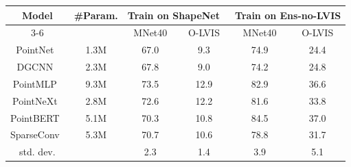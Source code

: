   \scriptsize
  \setlength{\tabcolsep}{1.7pt}
  \centering
  \vspace{-1em}
    \begin{tabular}{c|c|cc|cc}
    \toprule
    \multirow{2}[2]{*}{Model} & \multirow{2}[2]{*}{\#Param.} & \multicolumn{2}{c|}{Train on ShapeNet~\cite{chang2015shapenet}} & \multicolumn{2}{c}{Train on Ens-no-LVIS} \\
    \cmidrule{3-6}
          &       & MNet40  & O-LVIS & MNet40 & O-LVIS \\
    \midrule
    PointNet~\cite{qi2017pointnet}   & 1.3M & 67.0 &  9.3 & 74.9 & 24.4 \\
    DGCNN~\cite{wang2019dynamic}      & 2.3M & 67.8 &  9.0 & 74.2 & 24.8 \\
    PointMLP~\cite{ma2022rethinking}   & 9.3M & 73.5 & 12.9 & 82.9 & 36.6 \\
    PointNeXt~\cite{qian2022pointnext}  & 2.8M & 72.6 & 12.2 & 81.6 & 33.8 \\
    PointBERT~\cite{yu2021pointbert}  & 5.1M & 70.3 & 10.8 & 84.5 & 37.0 \\
    SparseConv~\cite{choy20194d} & 5.3M & 70.7 & 10.6 & 78.8 & 31.7 \\
    \midrule
    std. dev. &      &  2.3 &  1.4 &  3.9 & 5.1  \\
    \bottomrule
    \end{tabular}%
